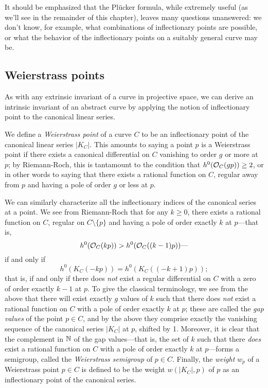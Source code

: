 It should be emphasized that the Pl\"ucker formula, while extremely useful (as we'll see in the remainder of this chapter), leaves many questions unanswered: we don't know, for example, what combinations of inflectionary points are possible, or what the behavior of the inflectionary points on a suitably general curve may be.

\subsection{Weierstrass points}

As with any extrinsic invariant of a curve in projective space, we can derive an intrinsic invariant of an abstract curve by applying the notion of inflectionary point to the canonical linear series. 

We define a \emph{Weierstrass point} of a curve $C$ to be an inflectionary point of the canonical linear series $|K_C|$. This amounts to saying a point $p$ is a Weierstrass point if there exists a canonical differential on $C$ vanishing to order $g$ or more at $p$; by Riemann-Roch, this is tantamount to the condition that $h^0({\mathcal O}_C(gp)) \geq 2$, or in other words to saying that there exists a rational function on $C$, regular away from $p$ and having a pole of order $g$ or less at $p$.

We can similarly characterize all the inflectionary indices of the canonical series at a point. We see from Riemann-Roch that for any $k \geq 0$, there exists a rational function on $C$, regular on $C \setminus \{p\}$ and having a pole of order exactly $k$ at $p$---that is,
$$
h^0({\mathcal O}_C(kp)) > h^0({\mathcal O}_C((k-1)p))\text{---}
$$
if and only if 
$$
h^0(K_C(-kp)) = h^0(K_C((-k+1)p)); 
$$
that is, if and only if there does \emph{not} exist a regular differential on $C$ with a zero of order exactly $k-1$ at $p$. To give the classical terminology, we see from the above that there will exist exactly $g$ values of $k$ such that there does \emph{not} exist a rational function on $C$ with a pole of order exactly $k$ at $p$; these are called the \emph{gap values} of the point $p \in C$, and by the above they comprise exactly the vanishing sequence of the canonical series $|K_C|$ at $p$, shifted by 1. Moreover, it is clear that the complement in ${\mathbb N}$ of the gap values---that is, the set of $k$ such that there \emph{does} exist a rational function on $C$ with a pole of order exactly $k$ at $p$---forms a semigroup, called the \emph{Weierstrass semigroup} of $p \in C$. Finally, the \emph{weight} $w_p$ of a Weierstrass point $p \in C$  is defined to be the weight $w(|K_C|,p)$ of $p$ as an inflectionary point of the canonical series.

